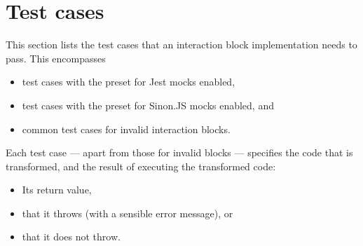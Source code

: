 \section*{Test cases}
This section lists the test cases that
an interaction block implementation needs to pass.
This encompasses
\begin{itemize}
  \item test cases with the preset for Jest mocks enabled,
  \item test cases with the preset for Sinon.JS mocks enabled, and
  \item common test cases for invalid interaction blocks.
\end{itemize}

Each test case
--- apart from those for invalid blocks ---
specifies the code that is transformed,
and the result of executing the transformed code:
\begin{itemize}
  \item Its return value,
  \item that it throws (with a sensible error message), or
  \item that it does not throw.
\end{itemize}















